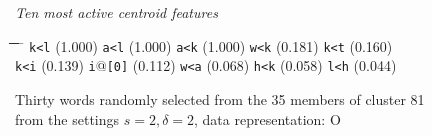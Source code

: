 \begin{figure}[!t]
\begin{mdframed}
\begin{normalsize}
\begin{tabbing}
\end{tabbing}
\end{normalsize}
\vspace{-5pt}
\begin{small}
\begin{mdframed}
\textit{Ten most active centroid features}
\vspace{-5pt}
\begin{tabbing}
\hspace*{6ex}\= \hspace*{12ex}\= \hspace*{6ex}\= \hspace*{12ex}\= \hspace*{6ex} \= \hspace*{12ex}\= \hspace*{6ex}\= \hspace*{12ex}\= \hspace*{6ex} \= \hspace*{10ex}\kill
\texttt{k<l} \> (1.000) \> \texttt{a<l} \> (1.000) \> \texttt{a<k} \> (1.000) \> \texttt{w<k} \> (0.181) \> \texttt{k<t} \> (0.160)\\
\texttt{k<i} \> (0.139) \> \texttt{i}@\texttt{[0]} \> (0.112) \> \texttt{w<a} \> (0.068) \> \texttt{h<k} \> (0.058) \> \texttt{l<h} \> (0.044)
\end{tabbing}
\end{mdframed}
\end{small}
\vspace{-5pt}
\caption{Thirty words randomly selected from the 35 members of cluster 81 from the settings $s=2,\delta =2$, data representation: O}
\label{fig:cluster-81-2-2-O}
\end{mdframed}
\end{figure}

